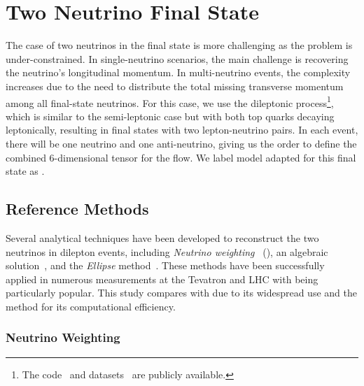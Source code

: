 \FloatBarrier

\section{Two Neutrino Final State}

The case of two neutrinos in the final state is more challenging as the problem is under-constrained.
In single-neutrino scenarios, the main challenge is recovering the neutrino's longitudinal momentum.
In multi-neutrino events, the complexity increases due to the need to distribute the total missing transverse momentum among all final-state neutrinos.
For this case, we use the dileptonic \ttbar process\footnote{The code~\cite{DileptonicTtbarNeutrino} and datasets~\cite{Nu2FlowsCode} are publicly available.}, which is similar to the semi-leptonic case but with both top quarks decaying leptonically, resulting in final states with two lepton-neutrino pairs.
In each event, there will be one neutrino and one anti-neutrino, giving us the order to define the combined 6-dimensional tensor for the flow.
We label model adapted for this final state as \vvflows.

\subsection{Reference Methods}

Several analytical techniques have been developed to reconstruct the two neutrinos in dilepton \ttbar events, including \emph{Neutrino weighting}~\cite{NuW} (\vweight), an algebraic solution~\cite{AlgebraicApproachSolve}, and the \emph{Ellipse} method~\cite{EllipseMethod}.
These methods have been successfully applied in numerous measurements at the Tevatron and LHC with \vweight being particularly popular.
This study compares \vvflows with \vweight due to its widespread use and the \ellipse method for its computational efficiency.

\subsubsection{Neutrino Weighting}

